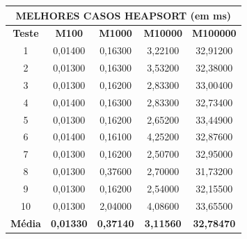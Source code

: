 \documentclass[a4paper, 12pt]{article}
\begin{document}
\begin{minipage}{1.05\textwidth}
 \begin{minipage}[c]{0.46\textwidth}
 \centering 
\begin{tabular}{ccccc}

   \multicolumn{ 5}{c}{{\bf MELHORES CASOS HEAPSORT (em ms)}} \\
\hline
{\bf Teste} & {\bf M100} & {\bf M1000} & {\bf M10000} & {\bf M100000} \\
\hline
         1 &    0,01400 &    0,16300 &    3,22100 &   32,91200 \\
\hline
         2 &    0,01300 &    0,16300 &    3,53200 &   32,38000 \\
\hline
         3 &    0,01300 &    0,16200 &    2,83300 &   33,00400 \\
\hline
         4 &    0,01400 &    0,16300 &    2,83300 &   32,73400 \\
\hline
         5 &    0,01300 &    0,16200 &    2,65200 &   33,44900 \\
\hline
         6 &    0,01400 &    0,16100 &    4,25200 &   32,87600 \\
\hline
         7 &    0,01300 &    0,16200 &    2,50700 &   32,95000 \\
\hline
         8 &    0,01300 &    0,37600 &    2,70000 &   31,73200 \\
\hline
         9 &    0,01300 &    0,16200 &    2,54000 &   32,15500 \\
\hline
        10 &    0,01300 &    2,04000 &    4,08600 &   33,65500 \\
\hline
{\bf Média} & {\bf 0,01330} & {\bf 0,37140} & {\bf 3,11560} & {\bf 32,78470} \\
\hline
\end{tabular}  
\end{minipage}\hfill
\begin{minipage}[c]{0.49\textwidth}
\centering
{}
\end{minipage}
\end{minipage}\hfill
\vspace{0.8cm}
\end{document}
